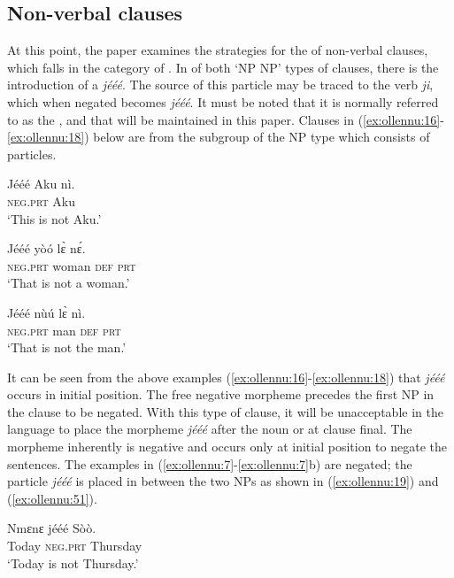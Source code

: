 \documentclass[output=paper
,newtxmath
,modfonts
,nonflat]{langsci/langscibook}
\begin{document}
\subsection{\label{sec:ollennu:2.1} Non-verbal clauses}

At this point, the paper examines the strategies for the  of non-verbal clauses, which falls in the category of . In  of both ‘NP NP’ types of clauses, there is the introduction of a  \textit{j\'e\'e\'e}. The source of this particle may be traced to the  verb \textit{ji}, which when negated becomes \textit{j\'e\'e\'e}. It must be noted that it is normally referred to as the , and that will be maintained in this paper. Clauses in (\ref{ex:ollennu:16}-\ref{ex:ollennu:18}) below are from the subgroup of the NP type which consists of particles.

\ea \label{ex:ollennu:16}
\gll J\'e\'e\'e Aku n\`i.\\
\textsc{neg}.\textsc{prt} Aku\\
\glt `This is not Aku.'
\z

\ea \label{ex:ollennu:17}
\gll J\'e\'e\'e y\`o\'o l\`ɛ n\'ɛ.\\
\textsc{neg}.\textsc{prt} woman \textsc{def} \textsc{prt}\\
\glt `That is not a woman.'
\z

\ea \label{ex:ollennu:18}
\gll J\'e\'e\'e n\`u\'u l\`ɛ n\`i.\\
\textsc{neg}.\textsc{prt} man \textsc{def} \textsc{prt}\\
\glt ‘That is not the man.’
\z

It can be seen from the above examples (\ref{ex:ollennu:16}-\ref{ex:ollennu:18}) that \textit{j\'e\'e\'e} occurs in initial position. The free negative morpheme precedes the first NP in the clause to be negated. With this type of clause, it will be unacceptable in the  language to place the morpheme \textit{j\'e\'e\'e} after the noun or at clause final. The morpheme inherently is negative and occurs only at initial position to negate the sentences. The examples in (\ref{ex:ollennu:7}-\ref{ex:ollennu:7}b) are negated; the particle \textit{j\'e\'e\'e} is placed in between the two NPs as shown in (\ref{ex:ollennu:19}) and (\ref{ex:ollennu:51}).

\ea \label{ex:ollennu:19}
\gll Nmɛnɛ j\'e\'e\'e S\`o\`o.\\
Today \textsc{neg}.\textsc{prt} Thursday\\
\glt `Today is not Thursday.'
\z
\end{document}

